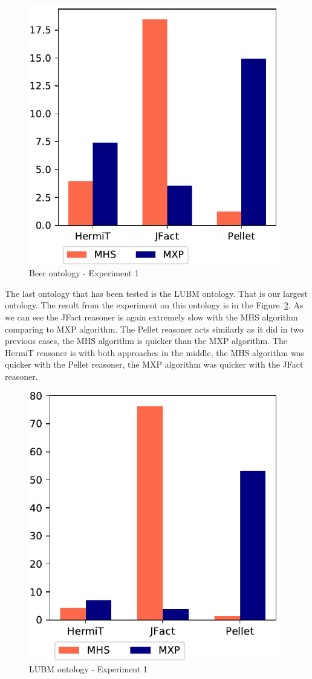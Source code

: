 \documentclass[12pt,a4paper]{article}
\begin{document}
\begin{figure}[H]
	\centering
	\includegraphics[width=11cm]{eval1Beer} 
	\caption{Beer ontology - Experiment 1}
	\label{fig:eval1Beer}
\end{figure}

The last ontology that has been tested is the LUBM ontology. That is our largest ontology. The result from the experiment on this ontology is in the Figure~\ref{fig:eval1LUBM}. As we can see the JFact reasoner is again extremely slow with the MHS algorithm comparing to MXP algorithm. The Pellet reasoner acts similarly as it did in two previous cases, the MHS algorithm is quicker than the MXP algorithm. The HermiT reasoner is with both approaches in the middle, the MHS algorithm was quicker with the Pellet reasoner, the MXP algorithm was quicker with the JFact reasoner.

\begin{figure}[H]
	\centering
	\includegraphics[width=11cm]{eval1LUBM} 
	\caption{LUBM ontology - Experiment 1}
	\label{fig:eval1LUBM}
\end{figure}
\end{document}
